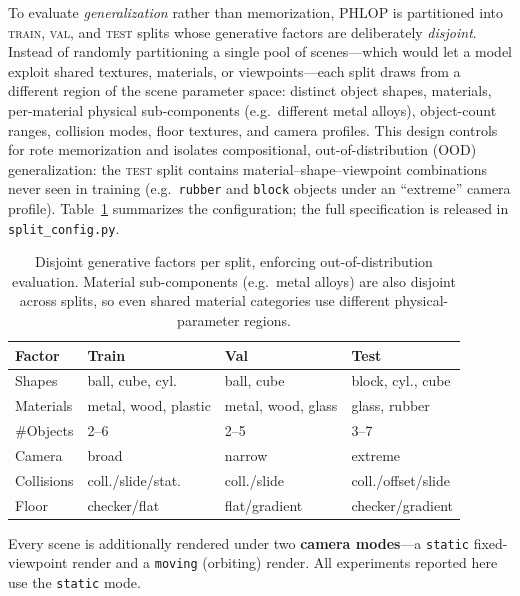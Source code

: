 To evaluate \emph{generalization} rather than memorization, PHLOP is partitioned
into \textsc{train}, \textsc{val}, and \textsc{test} splits whose generative
factors are deliberately \emph{disjoint}. Instead of randomly partitioning a
single pool of scenes---which would let a model exploit shared textures,
materials, or viewpoints---each split draws from a different region of the scene
parameter space: distinct object shapes, materials, per-material physical
sub-components (e.g.\ different metal alloys), object-count ranges, collision
modes, floor textures, and camera profiles. This design controls for rote
memorization and isolates compositional, out-of-distribution (OOD)
generalization: the \textsc{test} split contains material--shape--viewpoint
combinations never seen in training (e.g.\ \texttt{rubber} and \texttt{block}
objects under an ``extreme'' camera profile). Table~\ref{tab:splits} summarizes
the configuration; the full specification is released in
\texttt{split\_config.py}.

\begin{table}[t]
\centering
\caption{Disjoint generative factors per split, enforcing out-of-distribution
evaluation. Material sub-components (e.g.\ metal alloys) are also disjoint across
splits, so even shared material categories use different physical-parameter
regions.}
\label{tab:splits}
\small
\begin{tabular}{llll}
\toprule
Factor & Train & Val & Test \\
\midrule
Shapes        & ball, cube, cyl.     & ball, cube         & block, cyl., cube \\
Materials     & metal, wood, plastic & metal, wood, glass & glass, rubber \\
\#Objects     & 2--6                 & 2--5               & 3--7 \\
Camera        & broad                & narrow             & extreme \\
Collisions    & coll./slide/stat.    & coll./slide        & coll./offset/slide \\
Floor         & checker/flat         & flat/gradient      & checker/gradient \\
\bottomrule
\end{tabular}
\end{table}

Every scene is additionally rendered under two \textbf{camera modes}---a
\texttt{static} fixed-viewpoint render and a \texttt{moving} (orbiting) render.
All experiments reported here use the \texttt{static} mode.


